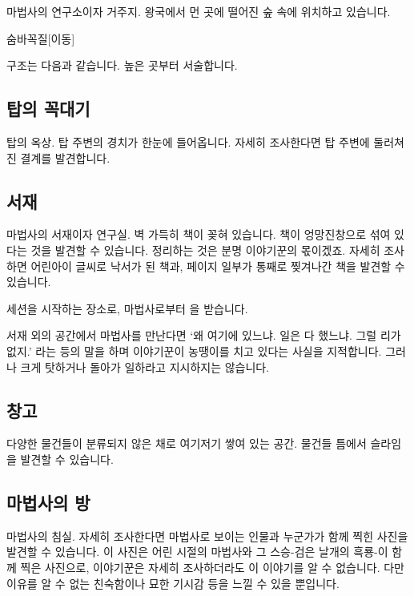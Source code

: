 \documentclass{report}
\begin{document}
	마법사의 연구소이자 거주지. 왕국에서 먼 곳에 떨어진 숲 속에 위치하고 있습니다.
	
	\begin{story}{숨바꼭질}{[이동]}
		
	\end{story}
	
	구조는 다음과 같습니다. 높은 곳부터 서술합니다.

	\subsection*{탑의 꼭대기}
		탑의 옥상. 탑 주변의 경치가 한눈에 들어옵니다. 자세히 조사한다면 탑 주변에 둘러쳐진 결계를 발견합니다.
	
	\subsection*{서재}
		마법사의 서재이자 연구실. 벽 가득히 책이 꽂혀 있습니다. 책이 엉망진창으로 섞여 있다는 것을 발견할 수 있습니다. 정리하는 것은 분명 이야기꾼의 몫이겠죠. 자세히 조사하면 어린아이 글씨로 낙서가 된 책과, 페이지 일부가 통째로 찢겨나간 책을 발견할 수 있습니다.
		
		세션을 시작하는 장소로, 마법사로부터 을 받습니다.
		
		서재 외의 공간에서 마법사를 만난다면 `왜 여기에 있느냐. 일은 다 했느냐. 그럴 리가 없지.' 라는 등의 말을 하며 이야기꾼이 농땡이를 치고 있다는 사실을 지적합니다. 그러나 크게 탓하거나 돌아가 일하라고 지시하지는 않습니다.
	
	\subsection*{창고}
		다양한 물건들이 분류되지 않은 채로 여기저기 쌓여 있는 공간. 물건들 틈에서 슬라임을 발견할 수 있습니다.
	
	\subsection*{마법사의 방}
		마법사의 침실. 자세히 조사한다면 마법사로 보이는 인물과 누군가가 함께 찍힌 사진을 발견할 수 있습니다. 이 사진은 어린 시절의 마법사와 그 스승-검은 날개의 흑룡-이 함께 찍은 사진으로, 이야기꾼은 자세히 조사하더라도 이 이야기를 알 수 없습니다. 다만 이유를 알 수 없는 친숙함이나 묘한 기시감 등을 느낄 수 있을 뿐입니다.
		
\end{document}
